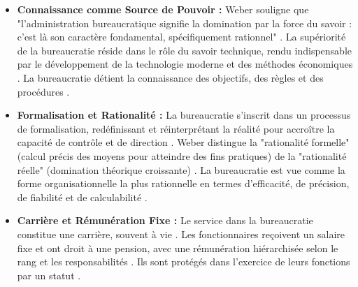 \documentclass[10pt, twocolumn]{article}
\begin{document}
\begin{itemize}
    \item \textbf{Connaissance comme Source de Pouvoir :} Weber souligne que "l'administration bureaucratique signifie la domination par la force du savoir : c'est là son caractère fondamental, spécifiquement rationnel" \citep{Weber1922}. La supériorité de la bureaucratie réside dans le rôle du savoir technique, rendu indispensable par le développement de la technologie moderne et des méthodes économiques \citep{Weber1922}. La bureaucratie détient la connaissance des objectifs, des règles et des procédures \citep{Jaelani2024}.
    \item \textbf{Formalisation et Rationalité :} La bureaucratie s'inscrit dans un processus de formalisation, redéfinissant et réinterprétant la réalité pour accroître la capacité de contrôle et de direction \citep{Serpa2019, Weber1922}. Weber distingue la "rationalité formelle" (calcul précis des moyens pour atteindre des fins pratiques) de la "rationalité réelle" (domination théorique croissante) \citep{Serpa2019}. La bureaucratie est vue comme la forme organisationnelle la plus rationnelle en termes d'efficacité, de précision, de fiabilité et de calculabilité \citep{Laguito2024, Hussain2019, RedfameIJSSS}.
    \item \textbf{Carrière et Rémunération Fixe :} Le service dans la bureaucratie constitue une carrière, souvent à vie \citep{Weber1922}. Les fonctionnaires reçoivent un salaire fixe et ont droit à une pension, avec une rémunération hiérarchisée selon le rang et les responsabilités \citep{Weber1922}. Ils sont protégés dans l'exercice de leurs fonctions par un statut \citep{Weber1922}.
\end{itemize}
\end{document}
